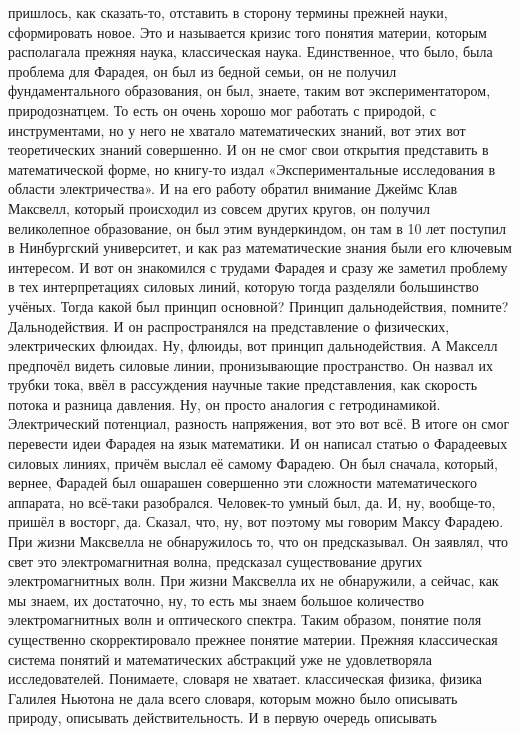 пришлось, как сказать-то, отставить в сторону термины прежней науки,
сформировать новое. Это и называется кризис того понятия материи, которым
располагала прежняя наука, классическая наука. Единственное, что было, была
проблема для Фарадея, он был из бедной семьи, он не получил фундаментального
образования, он был, знаете, таким вот экспериментатором, природознатцем. То
есть он очень хорошо мог работать с природой, с инструментами, но у него не
хватало математических знаний, вот этих вот теоретических знаний совершенно. И
он не смог свои открытия представить в математической форме, но книгу-то издал
«Экспериментальные исследования в области электричества». И на его работу
обратил внимание Джеймс Клав Максвелл, который происходил из совсем других
кругов, он получил великолепное образование, он был этим вундеркиндом, он там в
10 лет поступил в Нинбургский университет, и как раз математические знания были
его ключевым интересом. И вот он знакомился с трудами Фарадея и сразу же заметил
проблему в тех интерпретациях силовых линий, которую тогда разделяли большинство
учёных. Тогда какой был принцип основной? Принцип дальнодействия, помните?
Дальнодействия. И он распространялся на представление о физических,
электрических флюидах. Ну, флюиды, вот принцип дальнодействия. А Макселл
предпочёл видеть силовые линии, пронизывающие пространство. Он назвал их трубки
тока, ввёл в рассуждения научные такие представления, как скорость потока и
разница давления. Ну, он просто аналогия с гетродинамикой. Электрический
потенциал, разность напряжения, вот это вот всё. В итоге он смог перевести идеи
Фарадея на язык математики. И он написал статью о Фарадеевых силовых линиях,
причём выслал её самому Фарадею. Он был сначала, который, вернее, Фарадей был
ошарашен совершенно эти сложности математического аппарата, но всё-таки
разобрался. Человек-то умный был, да. И, ну, вообще-то, пришёл в восторг, да.
Сказал, что, ну, вот поэтому мы говорим Максу Фарадею. При жизни Максвелла не
обнаружилось то, что он предсказывал. Он заявлял, что свет это электромагнитная
волна, предсказал существование других электромагнитных волн. При жизни
Максвелла их не обнаружили, а сейчас, как мы знаем, их достаточно, ну, то есть
мы знаем большое количество электромагнитных волн и оптического спектра. Таким
образом, понятие поля существенно скорректировало прежнее понятие материи.
Прежняя классическая система понятий и математических абстракций уже не
удовлетворяла исследователей. Понимаете, словаря не хватает. классическая
физика, физика Галилея Ньютона не дала всего словаря, которым можно было
описывать природу, описывать действительность. И в первую очередь описывать
